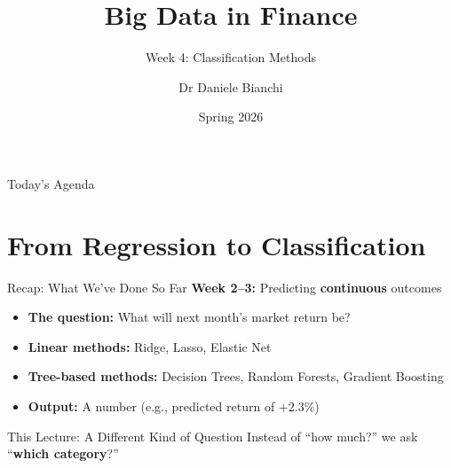 \documentclass[10pt]{beamer}
\title{Big Data in Finance}
\subtitle{Week 4: Classification Methods}
\author{Dr Daniele Bianchi}
\date{Spring 2026}
\newcommand{\highlight}[1]{\textcolor{AccentOrange}{\textbf{#1}}}
\begin{document}
\AtBeginSection[]{
  \begin{frame}[plain]
    \vfill
    \begin{center}
      {\Large\color{ThemeBlue}\insertsection}
    \end{center}
    \vfill
  \end{frame}
}


\begin{frame}[plain]
  \titlepage
\end{frame}

\begin{frame}{Today's Agenda}
  \tableofcontents
\end{frame}

\section{From Regression to Classification}

\begin{frame}{Recap: What We've Done So Far}
  \textbf{Week 2--3:} Predicting \highlight{continuous} outcomes

  \vspace{1em}
  \begin{itemize}
    \item \textbf{The question:} What will next month's market return be?
    \vspace{0.5em}
    \item \textbf{Linear methods:} Ridge, Lasso, Elastic Net
    \vspace{0.5em}
    \item \textbf{Tree-based methods:} Decision Trees, Random Forests, Gradient Boosting
    \vspace{0.5em}
    \item \textbf{Output:} A number (e.g., predicted return of $+2.3\%$)
  \end{itemize}

  \vspace{1em}
  \begin{block}{This Lecture: A Different Kind of Question}
    Instead of ``how much?'' we ask ``\highlight{which category}?''
  \end{block}
\end{frame}

\end{document}
